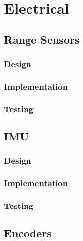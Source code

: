 
\chapter{Electrical}\label{electrical}



\section{Range Sensors}\label{elec/range}

\subsection{Design}\label{elec/range/design}

\subsection{Implementation}\label{elec/range/impl}

\subsection{Testing}\label{elec/range/test}



\section{IMU}\label{elec/imu}

\subsection{Design}\label{elec/imu/design}

\subsection{Implementation}\label{elec/imu/impl}

\subsection{Testing}\label{elec/imu/test}



\section{Encoders}\label{elec/encoder}

